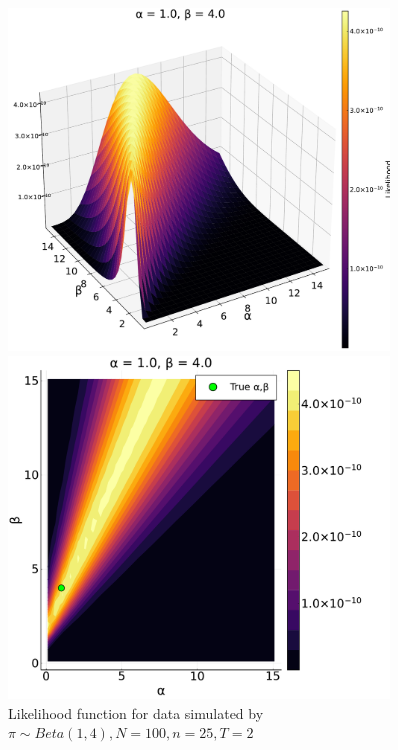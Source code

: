\documentclass[a4paper, 12pt]{article}
\begin{document}
\begin{figure}
    \centering
    \begin{minipage}{0.55\textwidth}
        \centering
        \includegraphics[width=0.9\textwidth]{../figures/Likelihood_sfplt_1.pdf} %
    \end{minipage}\hfill
    \begin{minipage}{0.45\textwidth}
        \centering
        \includegraphics[width=0.9\textwidth]{../figures/Likelihood_contplt_1.pdf} %
    \end{minipage}
    \caption{\small Likelihood function for data simulated by $\pi \sim Beta(1, 4), N = 100, n = 25, T = 2$}
\end{figure}
\end{document}
